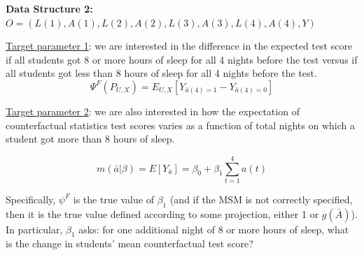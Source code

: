 \documentclass[answers]{exam}
\begin{document}
\pagebreak
\noindent\large\textbf{Data Structure 2: $O = (L(1), A(1), L(2), A(2), L(3), A(3), L(4), A(4), Y)$}
\normalsize

\noindent\underline{Target parameter 1}: we are interested in the difference in the expected test score if all students got 8 or more hours of sleep for all 4 nights before the test versus if all students got less than 8 hours of sleep for all 4 nights before the test.
\[
\Psi^F(P_{U,X}) = E_{U,X}[Y_{\bar{a}(4)=1} - Y_{\bar{a}(4)=0}]
\]

\noindent\underline{Target parameter 2}: we are also interested in how the expectation of counterfactual statistics test scores varies as a function of total nights on which a student got more than 8 hours of sleep. 

\[
m(\bar{a}|\beta) = E[Y_{\bar{a}}] = \beta_0 + \beta_1 \sum_{t=1}^4a(t)
\]

Specifically, $\psi^F$ is the true value of $\beta_1$ (and if the MSM is not correctly specified, then it is the true value defined according to some projection, either 1 or $g(\bar{A})$). In particular, $\beta_1$ asks: for one additional night of 8 or more hours of sleep, what is the change in students' mean counterfactual test score?
\end{document}
